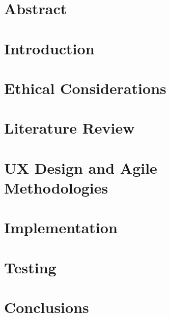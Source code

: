 \documentclass[oneside,openright,titlepage,numbers=noenddot,headinclude,footinclude=true,cleardoublepage=empty,listof=totoc,paper=a4,fontsize=11pt,english,BCOR=5mm]{scrreprt}
\begin{document}
  \frenchspacing
  \raggedbottom{}

  \pagestyle{plain}

  \singlespacing{}
  
  

  \onehalfspacing{}
  

  \chapter*{Abstract}
  

  

  \cleardoublepage{}
  \pagestyle{scrheadings}
  \onehalfspacing{}

  \chapter{Introduction}\label{c:Introduction}
  

  \chapter{Ethical Considerations}\label{c:Ethical-Considerations}
  

  \chapter{Literature Review}\label{c:Literature-Review}
  

  \chapter{UX Design and Agile Methodologies}\label{c:UX-Design-Agile-Methodologies}
  

  \chapter{Implementation}\label{c:Implementation}
  

  \chapter{Testing}\label{c:Testing}
  

  \chapter{Conclusions}\label{c:Conclusions}
  
\end{document}

